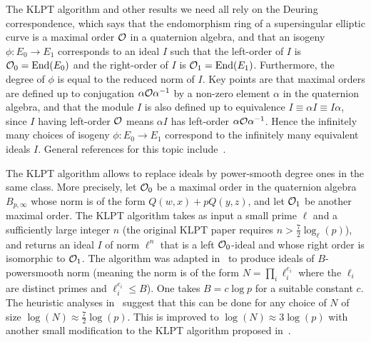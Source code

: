 The KLPT algorithm and other results we need all rely on the Deuring correspondence, which says that the endomorphism ring of a supersingular elliptic curve is a maximal order $\mathcal{O}$ in a quaternion algebra, and that an isogeny $\phi : E_0 \to E_1$ corresponds to an ideal $I$ such that the left-order of $I$ is $\mathcal{O}_0 = \text{End}(E_0)$ and the right-order of $I$ is $\mathcal{O}_1 = \text{End}(E_1)$. 
Furthermore, the degree of $\phi$ is equal to the reduced norm of $I$.
Key points are that maximal orders are defined up to conjugation $\alpha \mathcal{O} \alpha^{-1}$ by a non-zero element $\alpha$ in the quaternion algebra, and that the module $I$ is also defined up to equivalence $I \equiv \alpha I \equiv I \alpha$, since $I$ having left-order $\mathcal{O}$ means $\alpha I$ has left-order $\alpha \mathcal{O} \alpha^{-1}$.
Hence the infinitely many choices of isogeny $\phi : E_0 \to E_1$ correspond to the infinitely many equivalent ideals $I$.
General references for this topic include~\cite{Reductions18,KLPT}.

The KLPT algorithm allows to replace ideals by power-smooth degree ones in the same class.
%
More precisely, let $\mathcal{O}_0$ be a maximal order in the quaternion algebra $B_{p,\infty}$ whose norm is of the form $Q(w,x) + p Q(y,z)$, and let $\mathcal{O}_1$ be another maximal order.
%
The  KLPT algorithm takes as input a small prime $\ell$ and a sufficiently large integer $n$ (the original KLPT paper requires $n > \tfrac{7}{2}\log_\ell( p)$), and returns an ideal $I$ of norm $\ell^n$ that is a left $\mathcal{O}_0$-ideal and whose right order is isomorphic to $\mathcal{O}_1$. 
%
The algorithm was adapted in~\cite{GPS20} to produce ideals of $B$-powersmooth norm (meaning the norm is of the form $N = \prod_i\ell_i^{e_i}$ where the $\ell_i$ are distinct primes and $\ell_i^{e_i} \le B$).
One takes $B = c \log p $ for a suitable constant $c$.
The heuristic analyses in~\cite{GPS20} suggest that this can be done for any choice of $N$ of size $\log(N) \approx \tfrac{7}{2} \log(p)$.
%
This is improved to $\log(N) \approx 3 \log(p)$ with another small modification to the KLPT algorithm proposed in~\cite{PetitSmith}.
%



